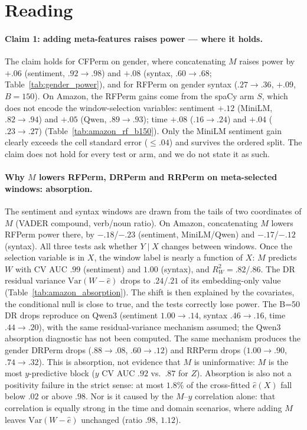 \section*{Reading}

\paragraph{Claim 1: adding meta-features raises power --- where it holds.}
The claim holds for CFPerm on gender, where concatenating $M$ raises power by $+.06$ (sentiment, $.92\to.98$)
and $+.08$ (syntax, $.60\to.68$; Table~\ref{tab:gender_power}), and for RFPerm on gender syntax
($.27\to.36$, $+.09$, $B{=}150$).
On Amazon, the RFPerm gains come from the spaCy arm $S$, which does not encode the window-selection
variables: sentiment $+.12$ (MiniLM, $.82\to.94$) and $+.05$ (Qwen, $.89\to.93$); time $+.08$
($.16\to.24$) and $+.04$ ($.23\to.27$) (Table~\ref{tab:amazon_rf_b150}).
Only the MiniLM sentiment gain clearly exceeds the cell standard error ($\le .04$) and survives the
ordered split.
The claim does not hold for every test or arm, and we do not state it as such.

\paragraph{Why $M$ lowers RFPerm, DRPerm and RRPerm on meta-selected windows: absorption.}
The sentiment and syntax windows are drawn from the tails of two coordinates of $M$
(VADER compound, verb/noun ratio).
On Amazon, concatenating $M$ lowers RFPerm power there, by $-.18$/$-.23$ (sentiment, MiniLM/Qwen)
and $-.17$/$-.12$ (syntax).
All three tests ask whether $Y\mid X$ changes between windows.
Once the selection variable is in $X$, the window label is nearly a function of $X$:
$M$ predicts $W$ with CV AUC $.99$ (sentiment) and $1.00$ (syntax), and $R^2_W=.82$/$.86$.
The DR residual variance $\mathrm{Var}(W-\hat e)$ drops to $.24$/$.21$ of its embedding-only value
(Table~\ref{tab:amazon_absorption}).
The shift is then explained by the covariates, the conditional null is close to true, and the tests
correctly lose power.
The B=50 DR drops reproduce on Qwen3 (sentiment $1.00\to.14$, syntax $.46\to.16$, time $.44\to.20$), with the
same residual-variance mechanism assumed; the Qwen3 absorption diagnostic has not been computed.
The same mechanism produces the gender DRPerm drops ($.88\to.08$, $.60\to.12$) and RRPerm drops
($1.00\to.90$, $.74\to.32$).
This is absorption, not evidence that $M$ is uninformative:
$M$ is the most $y$-predictive block ($y$ CV AUC $.92$ vs.\ $.87$ for $Z$).
Absorption is also not a positivity failure in the strict sense: at most $1.8\%$ of the
cross-fitted $\hat e(X)$ fall below $.02$ or above $.98$.
Nor is it caused by the $M$--$y$ correlation alone: that correlation is equally strong in the time and
domain scenarios, where adding $M$ leaves $\mathrm{Var}(W-\hat e)$ unchanged (ratio $.98$, $1.12$).

